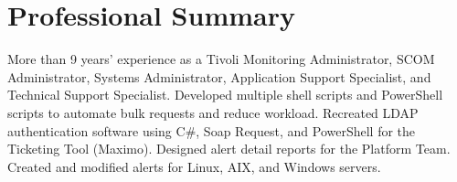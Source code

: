 \documentclass[letterpaper, 12pt]{article}
\begin{document}
	\begin{minipage}{0.5\textwidth}
\section*{Professional Summary}
\textnormal{More than 9 years' experience as a Tivoli Monitoring Administrator, SCOM Administrator, Systems Administrator, Application Support Specialist, and Technical Support Specialist. Developed multiple shell scripts and PowerShell scripts to automate bulk requests and reduce workload. Recreated LDAP authentication software using C\#, Soap Request, and PowerShell for the Ticketing Tool (Maximo). Designed alert detail reports for the Platform Team. Created and modified alerts for Linux, AIX, and Windows servers.} 


\end{minipage}
\end{document}
